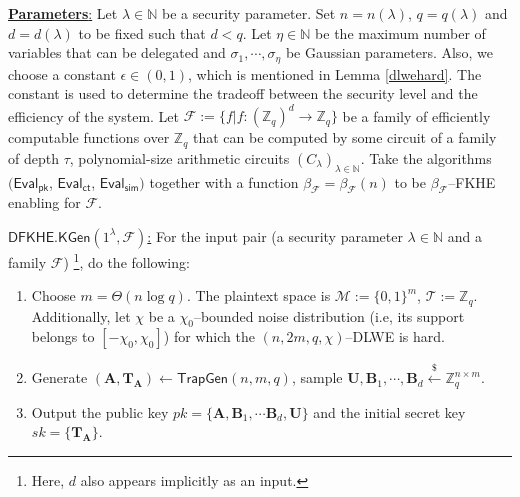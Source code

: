 \documentclass[runningheads,10pt]{llncs}
\begin{document}
\begin{description}	
\item \underline{\textbf{Parameters}:} Let $\lambda \in \mathbb{N}$ be a security parameter.  
Set $n=n(\lambda)$, $q=q(\lambda)$ and  $d=d(\lambda)$ to be fixed such that $d<q$. 
Let $\eta \in \mathbb{N}$ be the maximum number of variables that can be delegated and $\sigma_1, \cdots, \sigma_{\eta}$ 
be Gaussian parameters. Also, we choose a constant $\epsilon \in (0,1)$,
 which is mentioned in Lemma \ref{dlwehard}. 
 The constant is used to determine the tradeoff between the security level and the efficiency of the system. Let $\mathcal{F}:=\{ f| f: ( \mathbb{Z}_q)^d \rightarrow \mathbb{Z}_q\}$ be a family of efficiently computable functions over $\mathbb{Z}_q$ that can be computed by some circuit of a family of depth $\tau$, polynomial-size arithmetic circuits $(C_{\lambda})_{\lambda\in \mathbb{N}}$. Take the algorithms  $(\mathsf{Eval}_\mathsf{pk}$,   $\mathsf{Eval}_\mathsf{ct}$,  $ \mathsf{Eval}_\mathsf{sim})$ together with a function $\beta_{\mathcal{F}}=\beta_{\mathcal{F}}(n)$ to be $\beta_{\mathcal{F}}$--FKHE enabling for $\mathcal{F}$.%
\item \underline{$\textsf{DFKHE.KGen}(1^\lambda, \mathcal{F} )$:} 
	For the input pair (a security parameter $\lambda \in \mathbb{N}$ and a family $\mathcal{F}$) \footnote{Here, $d$ also appears implicitly as an input.}, do the following:
	\begin{enumerate}
		\item Choose  $m=\Theta{(n\log q)}$. The plaintext space is $\mathcal{M}:= \{0,1\}^m$,  $\mathcal{T}:=\mathbb{Z}_q$. Additionally, let $\chi$ be a $\chi_0$--bounded noise distribution (i.e, its support belongs to $[-\chi_0, \chi_0]$) for which the $(n,2m, q,\chi)$--DLWE is hard. 
		\item Generate $(\textbf{A},\textbf{T}_\textbf{A}) \leftarrow \textsf{TrapGen}(n,m,q)$,  sample $\textbf{U}, \textbf{B}_1, \cdots ,\textbf{B}_d \xleftarrow{\$} \mathbb{Z}_q^{n \times m}$. %
		\item Output  the public key $pk=\{\textbf{A},\textbf{B}_1, \cdots \textbf{B}_d , \textbf{U}\}$ and the initial secret key $sk=\{\textbf{T}_\textbf{A}\}$.
	\end{enumerate}
	

\end{description}
\end{document}
